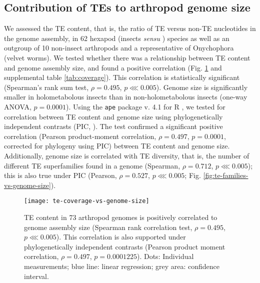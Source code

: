 \subsection{Contribution of TEs to arthropod genome size}

We assessed the TE content, that is, the ratio of TE versus non-TE
nucleotides in the genome assembly, in 62 hexapod (insects \emph{sensu}
\citet{Misof2014}) species as well as an outgroup of 10 non-insect
arthropods and a representative of Onychophora (velvet worms). We tested
whether there was a relationship between TE content and genome assembly
size, and found a positive correlation (Fig.
\ref{fig:te-coverage-vs-genome-size} and supplemental table
\ref{tab:coverage}). This correlation is statistically significant
(Spearman's rank sum test, \(\rho = 0.495\), \(p \lll 0.005\)). Genome
size is significantly smaller in holometabolous insects than in
non-holometabolous insects (one-way ANOVA, \(p = 0.0001\)). Using the
\texttt{ape} package v. 4.1 \citep{Paradis2004} for R
\citep{RCoreTeam2017}, we tested for correlation between TE content and
genome size using phylogenetically independent contrasts (PIC,
\citet{Felsenstein1985}). The test confirmed a significant positive
correlation (Pearson product-moment correlation, \(\rho = 0.497\), \(p =
0.0001\), corrected for phylogeny using PIC) between TE content and
genome size. Additionally, genome size is correlated with TE diversity,
that is, the number of different TE superfamilies found in a genome
(Spearman, \(\rho = 0.712\), \(p \lll 0.005\)); this is also true under
PIC (Pearson, \(\rho = 0.527\), \(p \lll 0.005\); Fig.
\ref{fig:te-families-vs-genome-size}).

\begin{figure}[h!]
\begin{center}
\texttt{[image: te-coverage-vs-genome-size]}
\caption[TE content is positively correlated to genome size in
arthropods]{{TE content in 73 arthropod genomes is positively correlated
to genome assembly size (Spearman rank correlation test, \(\rho =
0.495\), \(p \lll 0.005\)). This correlation is also supported under
phylogenetically independent contrasts \protect\citep{Felsenstein1985}
(Pearson product moment correlation, \(\rho = 0.497\), \(p =
0.0001225\)). Dots: Individual measurements; blue line: linear
regression; grey area: confidence interval.%
\label{fig:te-coverage-vs-genome-size}
}}
\end{center}
\end{figure}

